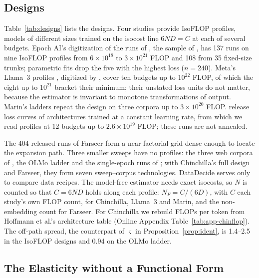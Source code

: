 \subsection{Designs}\label{sec:tech:designs}\label{sec:tech:chinchilla}

Table~\ref{tab:designs} lists the designs. Four studies provide IsoFLOP profiles, models of different sizes trained on
the isocost line $6ND=C$ at each of several budgets. Epoch AI's digitization of the runs of \citet{hoffmann2022training},
the sample of \citet{besiroglu2024chinchilla}, has 137 runs on nine IsoFLOP profiles from $6\times10^{18}$ to
$3\times10^{21}$ FLOP and 108 from 35 fixed-size trunks; parametric fits drop the five with the highest loss ($n=240$).
Meta's Llama~3 profiles \citep{grattafiori2024llama}, digitized by \citet{czech2026llama3isoflop}, cover ten budgets up
to $10^{22}$ FLOP, of which the eight up to $10^{21}$ bracket their minimum; their unstated loss units do not matter,
because the estimator is invariant to monotone transformations of output. Marin's ladders \citep{marin2026ladders}
repeat the design on three corpora up to $3\times10^{20}$ FLOP. \citet{porian2024resolving} release loss curves of
architectures trained at a constant learning rate, from which we read profiles at 12 budgets up to $2.6\times10^{19}$
FLOP; these runs are not annealed.

The 404 released runs of Farseer \citep{li2025predictableb} form a near-factorial grid dense enough to locate the
expansion path. Three smaller sweeps have no profiles: the three web corpora of \citet{gadre2024language}, the OLMo
ladder \citep{bhagia2024establishing} and the single-epoch runs of \citet{muennighoff2023scaling}; with Chinchilla's full
design and Farseer, they form seven sweep--corpus technologies. DataDecide \citep{magnusson2025datadecide} serves only to
compare data recipes. The model-free estimator needs exact isocosts, so $N$ is counted so that $C=6ND$ holds along each
profile: $N_F=C/(6D)$, with $C$ each study's own FLOP count, for Chinchilla, Llama~3 and Marin, and the non-embedding
count for Farseer. For Chinchilla we rebuild FLOPs per token from Hoffmann et al.'s architecture table (Online Appendix
Table~\ref{tab:app-chinflop}). The off-path spread, the counterpart of $\varsigma$ in Proposition~\ref{prop:ident}, is
1.4--2.5 in the IsoFLOP designs and 0.94 on the OLMo ladder.



\subsection{The Elasticity without a Functional Form}\label{sec:tech:modelfree}

